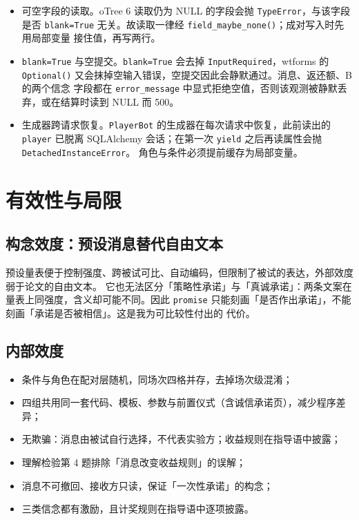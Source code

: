 \documentclass[10pt,a4paper]{ctexart}
\newcommand{\code}[1]{\texttt{#1}}
\begin{document}
\begin{itemize}
  \item 可空字段的读取。oTree 6 读取仍为 NULL 的字段会抛 \code{TypeError}，与该字段是否
        \code{blank=True} 无关。故读取一律经 \code{field\_maybe\_none()}；成对写入时先用局部变量
        接住值，再写两行。
  \item \code{blank=True} 与空提交。\code{blank=True} 会去掉 \code{InputRequired}，wtforms 的
        \code{Optional()} 又会抹掉空输入错误，空提交因此会静默通过。消息、返还额、B 的两个信念
        字段都在 \code{error\_message} 中显式拒绝空值，否则该观测被静默丢弃，或在结算时读到 NULL
        而 500。
  \item 生成器跨请求恢复。\code{PlayerBot} 的生成器在每次请求中恢复，此前读出的 \code{player}
        已脱离 SQLAlchemy 会话；在第一次 \code{yield} 之后再读属性会抛 \code{DetachedInstanceError}。
        角色与条件必须提前缓存为局部变量。
\end{itemize}

\section{有效性与局限}\label{sec:limits}

\subsection{构念效度：预设消息替代自由文本}

预设量表便于控制强度、跨被试可比、自动编码，但限制了被试的表达，外部效度弱于论文的自由文本。
它也无法区分「策略性承诺」与「真诚承诺」：两条文案在量表上同强度，含义却可能不同。因此
\code{promise} 只能刻画「是否作出承诺」，不能刻画「承诺是否被相信」。这是我为可比较性付出的
代价。

\subsection{内部效度}

\begin{itemize}
  \item 条件与角色在配对层随机，同场次四格并存，去掉场次级混淆；
  \item 四组共用同一套代码、模板、参数与前置仪式（含诚信承诺页），减少程序差异；
  \item 无欺骗：消息由被试自行选择，不代表实验方；收益规则在指导语中披露；
  \item 理解检验第 4 题排除「消息改变收益规则」的误解；
  \item 消息不可撤回、接收方只读，保证「一次性承诺」的构念；
  \item 三类信念都有激励，且计奖规则在指导语中逐项披露。
\end{itemize}
\end{document}

